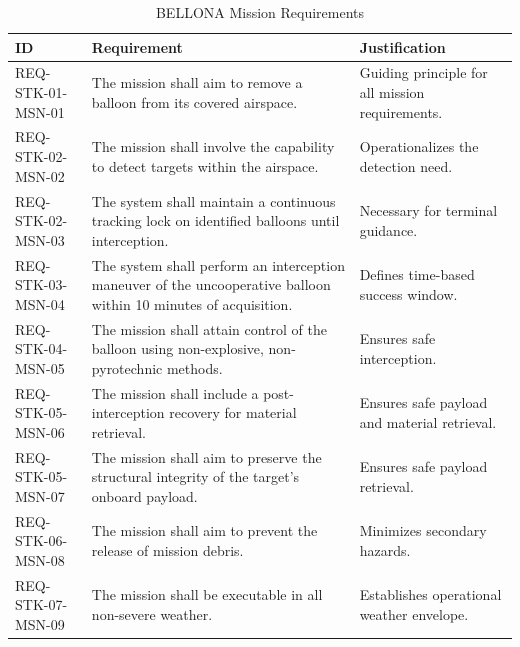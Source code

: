 \begin{xltabular}{\textwidth}{p{0.12\textwidth} X X}
\caption{BELLONA Mission Requirements}
\label{tab:missionreq} \\

\hline
\textbf{ID}       & \textbf{Requirement}                                                                                             & \textbf{Justification}                                                      \\ \hline
\endhead
\hline
\endfoot
%
REQ-STK-01-MSN-01 & The mission shall aim to remove a balloon from its covered airspace.                                             & Guiding principle for all mission requirements.                             \\
REQ-STK-02-MSN-02 & The mission shall involve the capability to detect targets within the airspace.                                  & Operationalizes the detection need.                                         \\
REQ-STK-02-MSN-03 & The system shall maintain a continuous tracking lock on identified balloons until interception.                  & Necessary for terminal guidance.                                            \\
REQ-STK-03-MSN-04 & The system shall perform an interception maneuver of the uncooperative balloon within 10 minutes of acquisition. & Defines time-based success window.                                          \\
REQ-STK-04-MSN-05 & The mission shall attain control of the balloon using non-explosive, non-pyrotechnic methods.                    & Ensures safe interception.                                                  \\
REQ-STK-05-MSN-06 & The mission shall include a post-interception recovery for material retrieval.                                   & Ensures safe payload and material retrieval.                                \\
REQ-STK-05-MSN-07 & The mission shall aim to preserve the structural integrity of the target's onboard payload.                      & Ensures safe payload retrieval.                                             \\
REQ-STK-06-MSN-08 & The mission shall aim to prevent the release of mission debris.                                                  & Minimizes secondary hazards.                                                \\
REQ-STK-07-MSN-09 & The mission shall be executable in all non-severe weather.                                                       & Establishes operational weather envelope.                                   \\

\end{xltabular}
